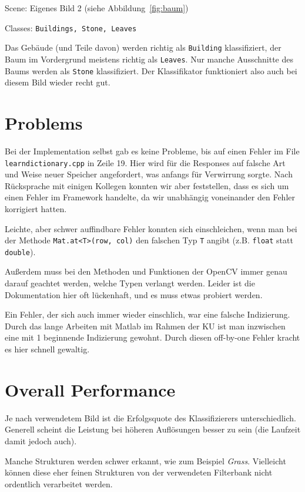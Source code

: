 Scene: Eigenes Bild 2 (siehe Abbildung~\ref{fig:baum})

Classes: \texttt{Buildings, Stone, Leaves}

Das Gebäude (und Teile davon) werden richtig als \texttt{Building} klassifiziert, der Baum im Vordergrund meistens richtig als \texttt{Leaves}. Nur manche Ausschnitte des Baums werden als \texttt{Stone} klassifiziert. Der Klassifikator funktioniert also auch bei diesem Bild wieder recht gut.



\chapter{Problems}

Bei der Implementation selbst gab es keine Probleme, bis auf einen Fehler im File \texttt{learndictionary.cpp} in Zeile 19. Hier wird für die Responses auf falsche Art und Weise neuer Speicher angefordert, was anfangs für Verwirrung sorgte. Nach Rücksprache mit einigen Kollegen konnten wir aber feststellen, dass es sich um einen Fehler im Framework handelte, da wir unabhängig voneinander den Fehler korrigiert hatten.

Leichte, aber schwer auffindbare Fehler konnten sich einschleichen, wenn man bei der Methode \texttt{Mat.at<T>(row, col)} den falschen Typ \texttt{T} angibt (z.B. \texttt{float} statt \texttt{double}).

Außerdem muss bei den Methoden und Funktionen der OpenCV immer genau darauf geachtet werden, welche Typen verlangt werden. Leider ist die Dokumentation hier oft lückenhaft, und es muss etwas probiert werden.

Ein Fehler, der sich auch immer wieder einschlich, war eine falsche Indizierung. Durch das lange Arbeiten mit Matlab im Rahmen der KU ist man inzwischen eine mit 1 beginnende Indizierung gewohnt. Durch diesen off-by-one Fehler kracht es hier schnell gewaltig.



\chapter{Overall Performance}

Je nach verwendetem Bild ist die Erfolgsquote des Klassifizierers unterschiedlich. Generell scheint die Leistung bei höheren Auflösungen besser zu sein (die Laufzeit damit jedoch auch).

Manche Strukturen werden schwer erkannt, wie zum Beispiel \emph{Grass}. Vielleicht können diese eher feinen Strukturen von der verwendeten Filterbank nicht ordentlich verarbeitet werden.

